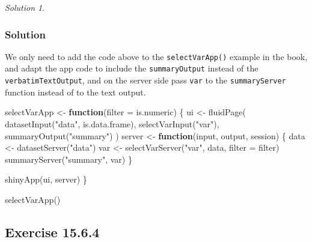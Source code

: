 \documentclass[
]{book}
\newenvironment{Shaded}{\begin{snugshade}}{\end{snugshade}}
\newcommand{\AttributeTok}[1]{\textcolor[rgb]{0.77,0.63,0.00}{#1}}
\newcommand{\ControlFlowTok}[1]{\textcolor[rgb]{0.13,0.29,0.53}{\textbf{#1}}}
\newcommand{\FunctionTok}[1]{\textcolor[rgb]{0.00,0.00,0.00}{#1}}
\newcommand{\NormalTok}[1]{#1}
\newcommand{\OtherTok}[1]{\textcolor[rgb]{0.56,0.35,0.01}{#1}}
\newcommand{\StringTok}[1]{\textcolor[rgb]{0.31,0.60,0.02}{#1}}
\theoremstyle{definition}
\theoremstyle{definition}
\theoremstyle{definition}
\theoremstyle{definition}
\theoremstyle{remark}
\newtheorem*{solution}{Solution}
\begin{document}
\begin{solution}
\leavevmode

\hypertarget{solution-48}{%
\subsubsection*{Solution}\label{solution-48}}

We only need to add the code above to the \texttt{selectVarApp()} example in the book, and adapt the app code to include the \texttt{summaryOutput} instead of the \texttt{verbatimTextOutput}, and on the server side pass \texttt{var} to the \texttt{summaryServer} function instead of to the text output.

\begin{Shaded}
\begin{Highlighting}[]
\NormalTok{selectVarApp }\OtherTok{\textless{}{-}} \ControlFlowTok{function}\NormalTok{(}\AttributeTok{filter =}\NormalTok{ is.numeric) \{}
\NormalTok{    ui }\OtherTok{\textless{}{-}} \FunctionTok{fluidPage}\NormalTok{(}
        \FunctionTok{datasetInput}\NormalTok{(}\StringTok{"data"}\NormalTok{, is.data.frame),}
        \FunctionTok{selectVarInput}\NormalTok{(}\StringTok{"var"}\NormalTok{),}
        \FunctionTok{summaryOutput}\NormalTok{(}\StringTok{"summary"}\NormalTok{)}
\NormalTok{    )}
\NormalTok{    server }\OtherTok{\textless{}{-}} \ControlFlowTok{function}\NormalTok{(input, output, session) \{}
\NormalTok{        data }\OtherTok{\textless{}{-}} \FunctionTok{datasetServer}\NormalTok{(}\StringTok{"data"}\NormalTok{)}
\NormalTok{        var }\OtherTok{\textless{}{-}} \FunctionTok{selectVarServer}\NormalTok{(}\StringTok{"var"}\NormalTok{, data, }\AttributeTok{filter =}\NormalTok{ filter)}
        \FunctionTok{summaryServer}\NormalTok{(}\StringTok{"summary"}\NormalTok{, var)}
\NormalTok{    \}}

    \FunctionTok{shinyApp}\NormalTok{(ui, server)}
\NormalTok{\}}

\FunctionTok{selectVarApp}\NormalTok{()}
\end{Highlighting}
\end{Shaded}

\end{solution}

\hypertarget{exercise-15.6.4}{%
\subsection*{Exercise 15.6.4}\label{exercise-15.6.4}}
\end{document}
